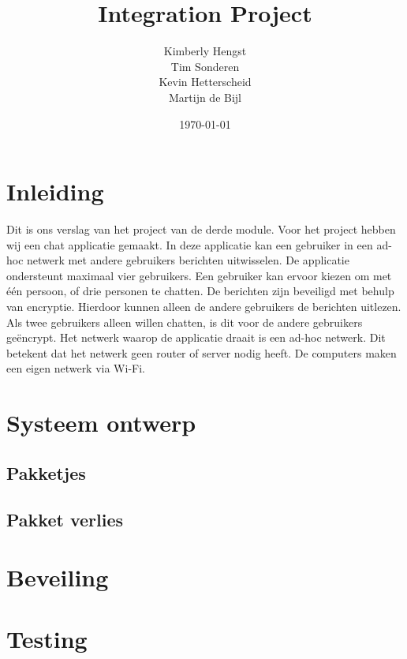 \documentclass{article}
\title{Integration Project}
\author{Kimberly Hengst \\ Tim Sonderen \\ Kevin Hetterscheid \\ Martijn de Bijl}
\date{\today}
\begin{document}
\maketitle

\newpage

\tableofcontents

\section{Inleiding}
Dit is ons verslag van het project van de derde module. Voor het project hebben wij een chat applicatie gemaakt. In deze applicatie kan een gebruiker in een ad-hoc netwerk met andere gebruikers berichten uitwisselen. De applicatie ondersteunt maximaal vier gebruikers. Een gebruiker kan ervoor kiezen om met één persoon, of drie personen te chatten. De berichten zijn beveiligd met behulp van encryptie. Hierdoor kunnen alleen de andere gebruikers de berichten uitlezen. Als twee gebruikers alleen willen chatten, is dit voor de andere gebruikers geëncrypt. Het netwerk waarop de applicatie draait is een ad-hoc netwerk. Dit betekent dat het netwerk geen router of server nodig heeft. De computers  maken een eigen netwerk via Wi-Fi.

\newpage

\section{Systeem ontwerp}
\subsection{Pakketjes}
\subsection{Pakket verlies}

\section{Beveiling}

\section{Testing}
\end{document}
